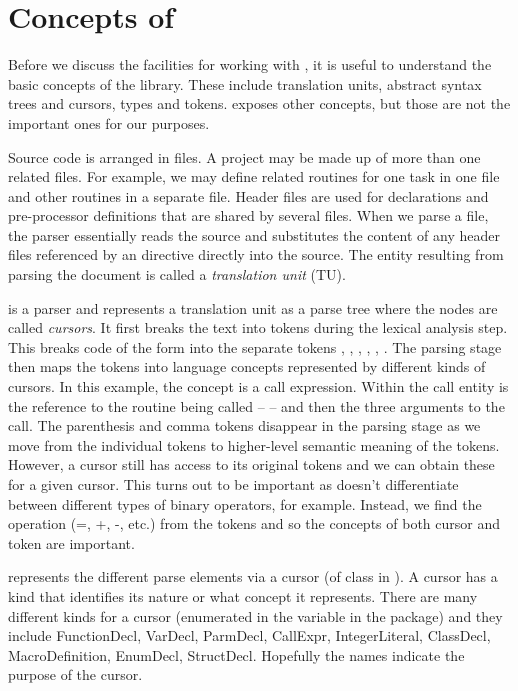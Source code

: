 \section[Concepts of libclang]{Concepts of \libclang}\label{sec:libclangConcepts}

Before we discuss the \R{} facilities for working with \libclang, it
is useful to understand the basic concepts of the library.  These
include translation units, abstract syntax trees and cursors, types
and tokens.  \libclang{} exposes other concepts, but those are not  the
important ones for our purposes.

Source code is arranged in files. A project may be made up of more
than one related files.  For example, we may define related routines
for one task in one file and other routines in a separate file.
Header files are used for declarations and pre-processor definitions
that are shared by several files.  When we parse a file, the parser
essentially reads the source and substitutes the content of any header
files referenced by an  directive directly into
the source.  The entity resulting from parsing the document is called
a \textit{translation unit} (TU).


\libclang{} is a parser and represents a translation unit as a parse
tree where the nodes are called \textit{cursors}.  It first breaks the
text into tokens during the lexical analysis step.  This breaks code
of the form  into the separate tokens
, \dquote{(}, , , ,
\dquote{)}.  The parsing stage then maps the tokens into language
concepts represented by different kinds of cursors.  In this example,
the concept is a call expression. Within the call entity is the
reference to the routine being called --  -- and then the
three arguments to the call.  The parenthesis and comma tokens
disappear in the parsing stage as we move from the individual tokens
to higher-level semantic meaning of the tokens.  However, a cursor
still has access to its original tokens and we can obtain these for a
given cursor. This turns out to be important as \libclang{} doesn't
differentiate between different types of binary operators, for
example. Instead, we find the operation (=, +, -, etc.)  from the
tokens and so the concepts of both cursor and token are important.

\libclang{} represents the different parse elements via a cursor (of
class  in \R).  A cursor has a kind that identifies
its nature or what concept it represents. There are many different
kinds for a cursor (enumerated in the variable  in
the  package) and they include FunctionDecl, VarDecl,
ParmDecl, CallExpr, IntegerLiteral, ClassDecl, MacroDefinition,
EnumDecl, StructDecl.  Hopefully the names indicate the purpose of the
cursor.

